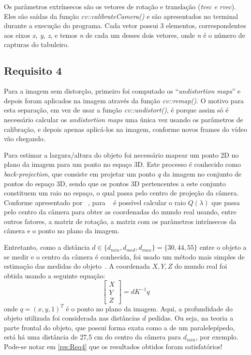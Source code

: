 \documentclass{bmvc2k}
\begin{document}
Os parâmetros extrínsecos são os vetores de rotação e translação (\textit{tvec e rvec}). Eles são saídas da função \textit{cv::calibrateCamera()} e são apresentados no terminal durante a execução do programa. Cada vetor possui 3 elementos, correspondentes aos eixos \textit{x, y, z}, e temos \textit{n} de cada um desses dois vetores, onde \textit{n} é o número de capturas do tabuleiro.

\subsection{Requisito 4}
\label{Met:Req4}
Para a imagem sem distorção, primeiro foi computado os ``\textit{undistortion maps}'' e depois foram aplicados na imagem através da função \textit{cv::remap()}. O motivo para esta separação, em vez de usar a função \textit{cv::undistort()}, é porque assim só é necessário calcular os \textit{undistortion maps} uma única vez usando os parâmetros de calibração, e depois apenas aplicá-los na imagem, conforme novos frames do vídeo vão chegando. 

Para estimar a largura/altura do objeto foi necessário mapear um ponto 2D no plano da imagem para um ponto no espaço 3D. Este processo é conhecido como \textit{back-projection}, que consiste em projetar um ponto \textit{q} da imagem no conjunto de pontos do espaço 3D, sendo que os pontos 3D pertencentes a este conjunto constituem um raio no espaço, o qual passa pelo centro de projeção da câmera. Conforme apresentado por ~\cite{relatoriomoodle}, para ~\cite{phdcoord} é possível calcular o raio $Q(\lambda)$ que passa pelo centro da câmera para obter as coordenadas do mundo real usando, entre outros fatores, a matriz de rotação, a matriz com os parâmetros intrínsecos da câmera e o ponto no plano da imagem.

Entretanto, como a distância $d \in \{d_{min}, d_{med}, d_{max}\} = \{30, 44, 55\}$ entre o objeto a se medir e o centro da câmera é conhecida, foi usado um método mais simples de estimação das medidas do objeto~\cite{stackoverflow}. A coordenada $X, Y, Z$ do mundo real foi obtida usando a seguinte equação: \begin{equation}
\begin{bmatrix}
X \\
Y \\
Z 
\end{bmatrix} = dK^{-1}q 
\end{equation} onde $q = (x, y, 1)^{T}$ é o ponto no plano da imagem. Aqui, a profundidade do objeto utilizada foi considerada nas distâncias $d$ pedidas. Ou seja, na teoria a parte frontal do objeto, que possui forma exata como a de um paralelepípedo, está há uma distância de 27,5 cm do centro da câmera para $d_{min}$, por exemplo. Pode-se notar em \ref{res:Req4} que os resultados obtidos foram satisfatórios!
\end{document}
